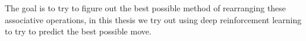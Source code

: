 The goal is to try to figure out the best possible method of rearranging these associative operations, in this thesis we try out using deep reinforcement learning to try to predict the best possible move.

\begin{comment}

$$(\text{E.exp\_way=A.exp\_way}\land \text{E.dir=East}\land \text{A.dir=EAST}\land \text{E.seg<A.seg} \land \text{E.seg>A.seg-5})}$$




\section{Optimization Specifications}
A first attempt at making a DQN we might narrow down to the fact that DQN will be query specific, we do not know the exact state we will be in nor do we know the exact reward we get until we do the action. 
\par The interesting part of this problem only arises due to complex queries, hence we need to remember that when choosing a query to solve, operations like join, Aggregation, duplication elemination and more result in complex queries generally.
\par Window size kept for training can change and a good window size needs to be figured out.
\par The underlying algorithms for joins, memory access and message passing should be fixed so results aren't affected by multiple attributes.
\par Need to encode the query and convert it into features for the DQN.
\par To determine what all should the features should capture, we need to look at the operations we will be performing, we also need an encoding for the query itself as well as the notations used in the previous chapter to calculate complexity.
\begin{itemize}
\item $B(R) \coloneqq$ is the number of blocks needed to hold all the tuples of relation $R$.
\item $T(R) \coloneqq$ is the number of tuples of relation $R$.
\item $V(R,a) \coloneqq$ is the value count for attribute a of relation $R$, that is, the number of distinct values relation $R$ has in attribute $a$.
\item $V(R, [ a_1 , a_2,..., a_n]) \coloneqq$ is the number of distinct values $R$ has when all of attributes $a_1, a_2,..., a_n$ are considered together, that is, the number of tuples in $\delta(\pi_{a_1,a_2,...,a_n}(R))$
\end{itemize}

\par The DQN should tell according to it's estimates what is the best action to take, what is the best ordering, which operation to perform.
\end{comment}


